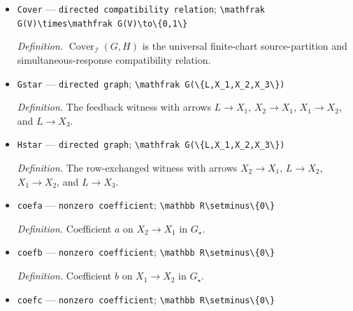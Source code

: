\documentclass{article}
\begin{document}
\begin{itemize}
  \par\smallskip\noindent\emph{Definition.} Scalars \(a_i\) satisfying \(C_{:,i}=a_iD_{:,f(i)}\).
  \item \texttt{Cover} --- \texttt{directed compatibility relation}; \texttt{\textbackslash{}\allowbreak{}mathfrak G(V)\textbackslash{}\allowbreak{}times\textbackslash{}\allowbreak{}mathfrak G(V)\textbackslash{}\allowbreak{}to\textbackslash{}\allowbreak{}\{0,\allowbreak{}1\textbackslash{}\allowbreak{}\}\allowbreak{}}
  \par\smallskip\noindent\emph{Definition.} \(\operatorname{Cover}_{\mathcal I}(G,H)\) is the universal finite-chart source-partition and simultaneous-response compatibility relation.
  \item \texttt{Gstar} --- \texttt{directed graph}; \texttt{\textbackslash{}\allowbreak{}mathfrak G(\textbackslash{}\allowbreak{}\{L,\allowbreak{}X\_\allowbreak{}1,\allowbreak{}X\_\allowbreak{}2,\allowbreak{}X\_\allowbreak{}3\textbackslash{}\allowbreak{}\}\allowbreak{})}
  \par\smallskip\noindent\emph{Definition.} The feedback witness with arrows \(L\to X_1\), \(X_2\to X_1\), \(X_1\to X_2\), and \(L\to X_3\).
  \item \texttt{Hstar} --- \texttt{directed graph}; \texttt{\textbackslash{}\allowbreak{}mathfrak G(\textbackslash{}\allowbreak{}\{L,\allowbreak{}X\_\allowbreak{}1,\allowbreak{}X\_\allowbreak{}2,\allowbreak{}X\_\allowbreak{}3\textbackslash{}\allowbreak{}\}\allowbreak{})}
  \par\smallskip\noindent\emph{Definition.} The row-exchanged witness with arrows \(X_2\to X_1\), \(L\to X_2\), \(X_1\to X_2\), and \(L\to X_3\).
  \item \texttt{coefa} --- \texttt{nonzero coefficient}; \texttt{\textbackslash{}\allowbreak{}mathbb R\textbackslash{}\allowbreak{}setminus\textbackslash{}\allowbreak{}\{0\textbackslash{}\allowbreak{}\}\allowbreak{}}
  \par\smallskip\noindent\emph{Definition.} Coefficient \(a\) on \(X_2\to X_1\) in \(G_\star\).
  \item \texttt{coefb} --- \texttt{nonzero coefficient}; \texttt{\textbackslash{}\allowbreak{}mathbb R\textbackslash{}\allowbreak{}setminus\textbackslash{}\allowbreak{}\{0\textbackslash{}\allowbreak{}\}\allowbreak{}}
  \par\smallskip\noindent\emph{Definition.} Coefficient \(b\) on \(X_1\to X_2\) in \(G_\star\).
  \item \texttt{coefc} --- \texttt{nonzero coefficient}; \texttt{\textbackslash{}\allowbreak{}mathbb R\textbackslash{}\allowbreak{}setminus\textbackslash{}\allowbreak{}\{0\textbackslash{}\allowbreak{}\}\allowbreak{}}

\end{itemize}
\end{document}
